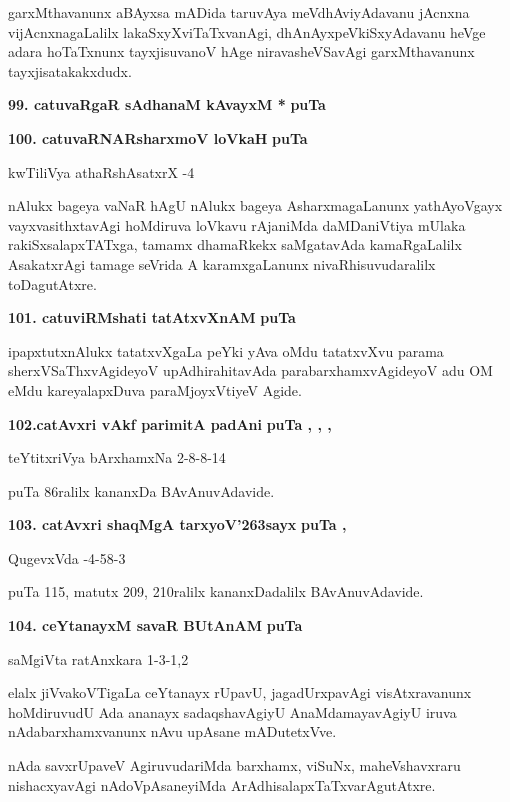 \smallskip
garxMthavanunx aBAyxsa mADida taruvAya meVdhAviyAdavanu jAcnxna vijAcnxnagaLalilx lakaSxyXviTaTxvanAgi, dhAnAyxpeVkiSxyAdavanu heVge adara hoTaTxnunx tayxjisuvanoV hAge niravasheVSavAgi garxMthavanunx tayxjisa\-takakxdudx.

\medskip
\noindent
\textbf{99. catuvaRgaR sAdhanaM kAvayxM *} \hfill{\bf puTa \pageref{193}}

\medskip
\noindent
\textbf{100. catuvaRNARsharxmoV loVkaH} \hfill{\bf puTa \pageref{90}}

\hfill{kwTiliVya athaRshAsatxrX -4}

\smallskip
nAlukx bageya vaNaR hAgU nAlukx bageya AsharxmagaLanunx yathAyoVgayx vayxvasithxtavAgi hoMdi\-ruva loVkavu rAjaniMda daMDaniVtiya mUlaka rakiSxsalapx\-TATxga, tamamx dhamaRkekx saMgatavAda kamaRgaLalilx Asakatx\-rAgi tamage seVrida A karamx\-gaLanunx nivaRhisuvudaralilx toDagutAtxre.

\medskip
\noindent
\textbf{101. catuviRMshati tatAtxvXnAM} \hfill{\bf puTa \pageref{150}}

\smallskip
ipapxtutxnAlukx tatatxvXgaLa peYki yAva oMdu tatatxvXvu parama sherxVSaThxvAgideyoV upAdhirahitavAda parabarxhamxvAgideyoV adu OM eMdu kareyalapxDuva paraMjoyxVtiyeV Agide.

\medskip
\noindent
\textbf{102.catAvxri vAkf parimitA padAni} \hfill{\bf puTa \pageref{1}, \pageref{31}, \pageref{86}, \pageref{152}}

\hfill{teYtitxriVya bArxhamxNa 2-8-8-14}

\smallskip
puTa 86ralilx kananxDa BAvAnuvAdavide.

\medskip
\noindent
\textbf{103. catAvxri shaqMgA tarxyoV\char'263sayx} \hfill{\bf puTa \pageref{111}, \pageref{208}}

\hfill{QugevxVda -4-58-3}

\smallskip
puTa 115, matutx 209, 210ralilx kananxDadalilx BAvAnuvAdavide.

\medskip
\noindent
\textbf{104. ceYtanayxM savaR BUtAnAM} \hfill{\bf puTa \pageref{149}}

\hfill{saMgiVta ratAnxkara 1-3-1,2}

\smallskip
elalx jiVvakoVTigaLa ceYtanayx rUpavU, jagadUrxpavAgi visAtxravanunx hoMdiru\-vudU Ada ananayx sadaqshavAgiyU AnaMdamayavAgiyU iruva nAdabarxhamx\-vanunx nAvu upAsane mADutetxVve.

nAda savxrUpaveV AgiruvudariMda barxhamx, viSuNx, maheVshavxraru nishacxyavAgi nAdoVpAsaneyiMda ArA\-dhisa\-lapxTaTxvarAgutAtxre.

